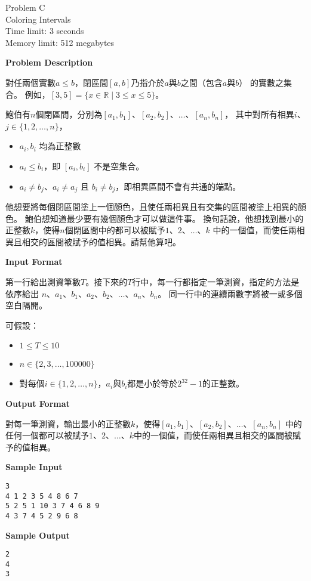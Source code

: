 \begin{center}
    {\LARGE Problem C}\vspace{1mm}\\
    {\Large Coloring Intervals}\\
    {Time limit: 3 seconds}\\
    {Memory limit: 512 megabytes}
\end{center}

\textbf{\large Problem Description}

對任兩個實數$a\le b$，閉區間$[a,b]$乃指介於$a$與$b$之間（包含$a$與$b$）
的實數之集合。
例如，$[3,5]=\{x\in\mathbb{R}\mid 3\le x\le 5\}$。

鮑伯有$n$個閉區間，分別為$[a_1,b_1]$、$[a_2,b_2]$、$\ldots$、$[a_n,b_n]$，
其中對所有相異$i$、$j\in\{1,2,\ldots,n\}$，
\begin{itemize}
\item $a_i,b_i$ 均為正整數
\item $a_i\le b_i$，即 $[a_i,b_i]$ 不是空集合。
\item $a_i\neq b_j$、$a_i\neq a_j$ 且 $b_i\neq b_j$，即相異區間不會有共通的端點。
\end{itemize}
他想要將每個閉區間塗上一個顏色，且使任兩相異且有交集的區間被塗上相異的顏色。
鮑伯想知道最少要有幾個顏色才可以做這件事。
換句話說，他想找到最小的正整數$k$，使得$n$個閉區間中的都可以被賦予$1$、$2$、$\ldots$、$k$
中的一個值，而使任兩相異且相交的區間被賦予的值相異。請幫他算吧。

\textbf{\large Input Format}

第一行給出測資筆數$T$。接下來的$T$行中，每一行都指定一筆測資，指定的方法是依序給出
$n$、$a_1$、$b_1$、$a_2$、$b_2$、$\ldots$、$a_n$、$b_n$。
同一行中的連續兩數字將被一或多個空白隔開。

可假設：
\begin{itemize}
    \tightlist{}
    \item $1 \le T \le 10$
    \item $n\in \{2,3,\ldots,100000\}$
    \item 對每個$i\in\{1,2,\ldots,n\}$，$a_i$與$b_i$都是小於等於$2^{32}-1$的正整數。
\end{itemize}

\textbf{\large Output Format}

對每一筆測資，輸出最小的正整數$k$，使得$[a_1,b_1]$、$[a_2,b_2]$、$\ldots$、$[a_n,b_n]$
中的任何一個都可以被賦予$1$、$2$、$\ldots$、$k$中的一個值，而使任兩相異且相交的區間被賦予的值相異。

\textbf{\large Sample Input}

\begin{verbatim}
3
4 1 2 3 5 4 8 6 7
5 2 5 1 10 3 7 4 6 8 9
4 3 7 4 5 2 9 6 8
\end{verbatim}

\textbf{\large Sample Output}
\begin{verbatim}
2
4
3
\end{verbatim}

